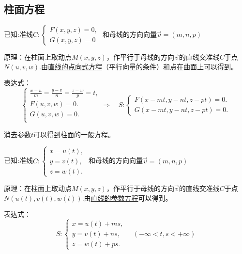 \subsection{柱面方程}
\ttheorem[柱面的一般方程]

\par {\color{dy}已知}:准线$C:
\begin{cases}
F(x,y,z)=0,\\
G(x,y,z)=0
\end{cases}$
和母线的方向向量$\overrightarrow{v}=(m,n,p)$\\
\par {\color{dy}原理}：在柱面上取动点$M(x,y,z)$，作平行于母线的方向$\overrightarrow{v}$的直线交准线$C$于点$N(u,v,w).$由\hyperref[点向式方程]{\color{超链接}直线的点向式方程}（平行向量的条件）和点在曲面上可以得到。
\par {\color{dy}表达式}：
\begin{equation}
\begin{cases}
\displaystyle \frac{x-u}{m}=\frac{y-v}{n}=\frac{z-w}{p}=t,\\
F(u,v,w)=0.\\
G(u,v,w)=0.\\
\end{cases}
\Longrightarrow \quad 
S:
\begin{cases}
F(x-mt,y-nt,z-pt)=0.\\
G(x-mt,y-nt,z-pt)=0.
\end{cases}
\end{equation}
\par 消去参数$t$可以得到柱面的一般方程。

\theorem[柱面的参数方程]

\par {\color{dy}已知}:准线$C:
\begin{cases}
x=u(t),\\
y=v(t),\\
z=w(t).
\end{cases}$
和母线的方向向量$\overrightarrow{v}=(m,n,p)$\\
\par {\color{dy}原理}：在柱面上取动点$M(x,y,z)$，作平行于母线的方向$\overrightarrow{v}$的直线交准线$C$于点$N(u(t),v(t),w(t)).$由\hyperref[直线的参数方程]{\color{超链接}直线的参数方程}可以得到。
\par {\color{dy}表达式}：
\begin{equation}
S:\begin{cases}
x=u(t)+ms,\\
y=v(t)+ns,\\
z=w(t)+ps.
\end{cases}
\quad (-\infty<t,s<+\infty)
\end{equation}

